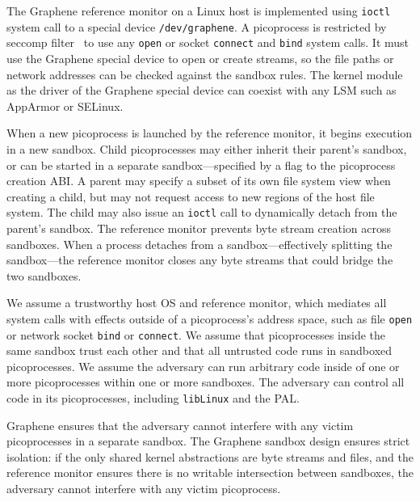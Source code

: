 The Graphene reference monitor on a Linux host
is implemented using {\tt ioctl} system call to a special device {\tt /dev/graphene}.
A picoprocess is restricted by seccomp filter~\cite{seccomp} to use any {\tt open} or socket {\tt connect} and {\tt bind} system calls.
It must use the Graphene special device to open or create streams,
so the file paths or network addresses can be checked against the sandbox rules.
The kernel module as the driver of the Graphene special device can coexist with any LSM such as AppArmor or SELinux.


When a new picoprocess is launched by the reference monitor, it begins execution in 
a new sandbox.  
Child picoprocesses may either inherit their parent's sandbox, 
or can be started in a separate sandbox---specified
by a flag to the picoprocess creation ABI.
A parent may specify a subset of its own file system view 
when creating a child, but may not request access to new regions of the 
host file system. 
The child may also issue an {\tt ioctl} call to 
dynamically detach from the parent's sandbox. The reference monitor prevents byte stream creation 
across sandboxes.
When a process detaches from a sandbox---effectively splitting the sandbox---the
reference monitor closes
any byte streams that could bridge the two sandboxes.

\vspace{5pt}
We assume  a trustworthy host OS and reference monitor,
which mediates all system calls with effects outside of a picoprocess's address space,
such as file {\tt open} or network socket {\tt bind} or {\tt connect}.
We assume that picoprocesses inside the same sandbox trust each other and that all untrusted code runs in sandboxed picoprocesses.
We assume the adversary can run arbitrary code inside of
one or more picoprocesses within one or more sandboxes.
The adversary can control all code in its
picoprocesses, including {\tt libLinux} and the PAL. 

Graphene ensures that %
the adversary cannot interfere with any victim picoprocesses
in a separate sandbox.  
The Graphene sandbox design ensures strict isolation: 
if the only shared kernel abstractions are byte streams and files, 
and the reference monitor ensures
there is no writable intersection between sandboxes,
the adversary cannot interfere with any victim picoprocess.


